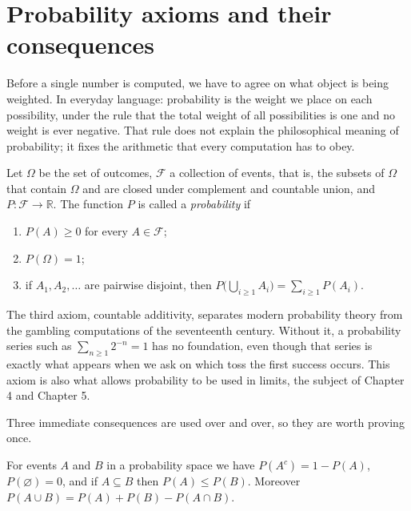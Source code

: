 \section{Probability axioms and their consequences}

Before a single number is computed, we have to agree on what object is being weighted. In
everyday language: probability is the weight we place on each possibility, under the rule
that the total weight of all possibilities is one and no weight is ever negative. That rule
does not explain the philosophical meaning of probability; it fixes the arithmetic that
every computation has to obey.



\begin{definisi}
Let $\Omega$ be the set of outcomes, $\mathcal{F}$ a collection of events, that is, the
subsets of $\Omega$ that contain $\Omega$ and are closed under complement and countable
union, and $P\colon\mathcal{F}\to\mathbb{R}$. The function $P$ is called a
\emph{probability} if
\begin{enumerate}
  \item $P(A)\ge 0$ for every $A\in\mathcal{F}$;
  \item $P(\Omega)=1$;
  \item if $A_{1},A_{2},\dots$ are pairwise disjoint, then
        $P\bigl(\bigcup_{i\ge 1}A_{i}\bigr)=\sum_{i\ge 1}P(A_{i})$.
\end{enumerate}
\end{definisi}

The third axiom, countable additivity, separates modern probability theory from the
gambling computations of the seventeenth century. Without it, a probability series such as
$\sum_{n\ge 1}2^{-n}=1$ has no foundation, even though that series is exactly what appears
when we ask on which toss the first success occurs. This axiom is also what allows
probability to be used in limits, the subject of Chapter 4 and Chapter 5.

Three immediate consequences are used over and over, so they are worth proving once.

\begin{proposisi}
For events $A$ and $B$ in a probability space we have
$P(A^{c})=1-P(A)$, $P(\varnothing)=0$, and if $A\subseteq B$ then
$P(A)\le P(B)$. Moreover
$P(A\cup B)=P(A)+P(B)-P(A\cap B)$.
\end{proposisi}

